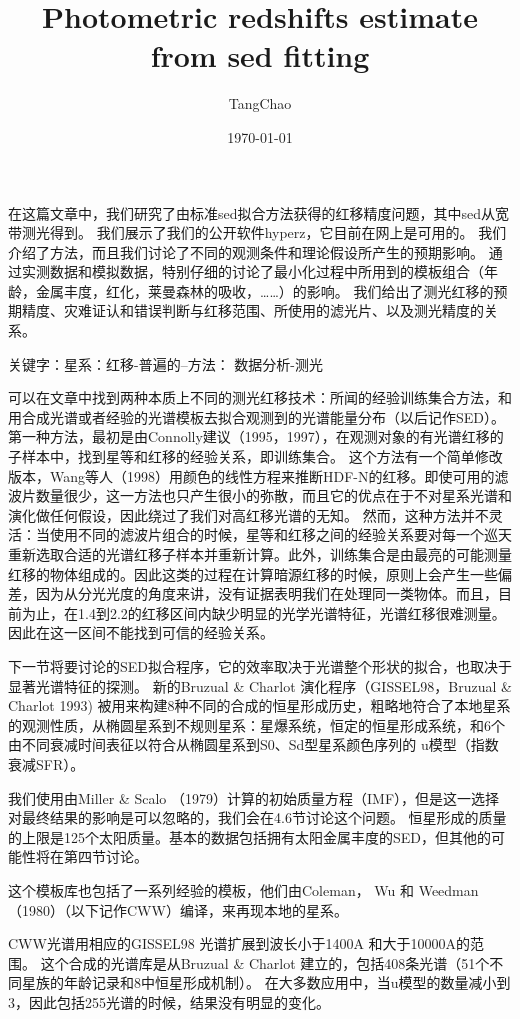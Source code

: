 \documentclass[8pt,a4paper,openany,twoside]{book}
\title{Photometric redshifts estimate from sed fitting}
\author{TangChao}
\date{\today}
\begin{document}
\maketitle
 
在这篇文章中，我们研究了由标准sed拟合方法获得的红移精度问题，其中sed从宽带测光得到。
我们展示了我们的公开软件hyperz，它目前在网上是可用的。
我们介绍了方法，而且我们讨论了不同的观测条件和理论假设所产生的预期影响。
通过实测数据和模拟数据，特别仔细的讨论了最小化过程中所用到的模板组合（年龄，金属丰度，红化，莱曼森林的吸收，……）的影响。
我们给出了测光红移的预期精度、灾难证认和错误判断与红移范围、所使用的滤光片、以及测光精度的关系。
 
关键字：星系：红移-普遍的--方法： 数据分析-测光
 
可以在文章中找到两种本质上不同的测光红移技术：所闻的经验训练集合方法，和用合成光谱或者经验的光谱模板去拟合观测到的光谱能量分布（以后记作SED）。
第一种方法，最初是由Connolly建议（1995，1997），在观测对象的有光谱红移的子样本中，找到星等和红移的经验关系，即训练集合。
这个方法有一个简单修改版本，Wang等人（1998）用颜色的线性方程来推断HDF-N的红移。即使可用的滤波片数量很少，这一方法也只产生很小的弥散，而且它的优点在于不对星系光谱和演化做任何假设，因此绕过了我们对高红移光谱的无知。
然而，这种方法并不灵活：当使用不同的滤波片组合的时候，星等和红移之间的经验关系要对每一个巡天重新选取合适的光谱红移子样本并重新计算。此外，训练集合是由最亮的可能测量红移的物体组成的。因此这类的过程在计算暗源红移的时候，原则上会产生一些偏差，因为从分光光度的角度来讲，没有证据表明我们在处理同一类物体。而且，目前为止，在1.4到2.2的红移区间内缺少明显的光学光谱特征，光谱红移很难测量。因此在这一区间不能找到可信的经验关系。
 
 
下一节将要讨论的SED拟合程序，它的效率取决于光谱整个形状的拟合，也取决于显著光谱特征的探测。
新的Bruzual \& Charlot 演化程序（GISSEL98，Bruzual \& Charlot 1993) 被用来构建8种不同的合成的恒星形成历史，粗略地符合了本地星系的观测性质，从椭圆星系到不规则星系：星爆系统，恒定的恒星形成系统，和6个由不同衰减时间表征以符合从椭圆星系到S0、Sd型星系颜色序列的 u模型（指数衰减SFR）。
 
我们使用由Miller \& Scalo （1979）计算的初始质量方程（IMF），但是这一选择对最终结果的影响是可以忽略的，我们会在4.6节讨论这个问题。
恒星形成的质量的上限是125个太阳质量。基本的数据包括拥有太阳金属丰度的SED，但其他的可能性将在第四节讨论。
 
这个模板库也包括了一系列经验的模板，他们由Coleman， Wu 和 Weedman（1980）（以下记作CWW）编译，来再现本地的星系。
 
CWW光谱用相应的GISSEL98 光谱扩展到波长小于1400A 和大于10000A的范围。
这个合成的光谱库是从Bruzual \& Charlot 建立的，包括408条光谱（51个不同星族的年龄记录和8中恒星形成机制）。
在大多数应用中，当u模型的数量减小到3，因此包括255光谱的时候，结果没有明显的变化。
 
\end{document}
